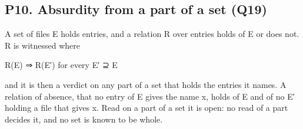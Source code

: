 \begin{itemize}
\end{itemize}

\subsection{\texorpdfstring{P10. Absurdity from a part of a set (Q19)}{P10. Absurdity from a part of a set (Q19)}}

A set of files E holds entries, and a relation R over entries holds of E or does not. R is witnessed where

R(E) ⇒ R(E′) for every E′ ⊇ E

and it is then a verdict on any part of a set that holds the entries it names. A relation of absence, that no entry of E gives the name x, holds of E and of no E′ holding a file that gives x. Read on a part of a set it is open: no read of a part decides it, and no set is known to be whole.

